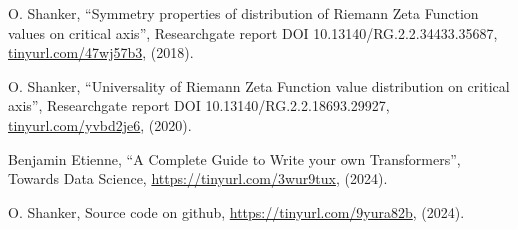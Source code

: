 \documentclass[twoside]{article}
\begin{document}
\begin{thebibliography}{10}
 O. Shanker, 
``Symmetry properties of distribution of Riemann Zeta Function values on critical axis'',
 Researchgate report DOI 10.13140/RG.2.2.34433.35687,
\url{tinyurl.com/47wj57b3}, 
(2018). 

 O. Shanker, 
``Universality of Riemann Zeta Function value distribution on critical axis'',
 Researchgate report DOI 10.13140/RG.2.2.18693.29927,
\url{tinyurl.com/yvbd2je6}, 
(2020). 

 Benjamin Etienne, 
``A Complete Guide to Write your own Transformers'',
 Towards Data Science,
\url{https://tinyurl.com/3wur9tux}, 
(2024). 

 O. Shanker, 
Source code on github,
\url{https://tinyurl.com/9yura82b}, 
(2024). 



\end{thebibliography} 
\end{document}

